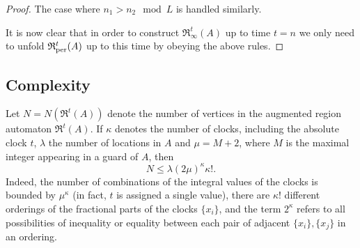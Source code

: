 \documentclass[11pt]{amsart}
\theoremstyle{definition}
\newcommand{\ARRR}{\mathfrak{R}^t}
\newcommand{\IARRR}{\mathfrak{R}_{\infty}^{t}}
\newcommand{\PARRR}{\mathfrak{R}_\textnormal{per}^{t}}
\newcommand{\ZNaturals}{\mathbb{N}_0}
\begin{document}
\begin{proof}
	The case where $n_1 > n_2 \mod L$ is handled similarly.   
	 \iffalse	
	So, let $e$ be a directed edge of $\PARRR(A)$ joining a vertex of integral time $\lfloor t \rfloor = n_1 + L\ZNaturals$, to a vertex of integral time $\lfloor t \rfloor = n_2 + L\ZNaturals$.
	Suppose also that $n_1 \leq n_2$ then there are then two possibilities.
	Either the edge represents a minimal time difference $n_2-n_1$ or a minimal time difference $n_2+L-n_1$.
	In order to distinguish between these two cases we mark the edge in the latter case with a plus sign.
	Since the period $L$ satisfies $L>M$ then if the time difference  $n_2+kL-n_1$, for some $k > 1$ then necessarily there exists also a similar edge with time difference $n_2+L-n_1$, thus the minimal time difference cannot be $n_2+kL-n_1$, $k > 1$.
	However, we need also distinguish between the case where there is only one possible time difference $d$ or there are infinitely-many time differences $d + kL$, $k \geq 0$, and in the latter case we mark the edge with $(*)$.
	
	Similarly, when $n_1 > n_2$ then either the minimal time difference is $n_2+L-n_1$ or a minimal time difference $n_2+2L-n_1$, and in the latter case we mark the edge with a plus sign.
	Again, we add also the $(*)$ mark to represent the infinitely-many time differences $d + kL$, $k \geq 0$. 
	\fi
	It is now clear that in order to construct $\IARRR(A)$ up to time $t=n$ we only need to unfold $\PARRR(A)$ up to this time by obeying the above rules.
\end{proof}
\subsection{Complexity}
Let $N = N(\ARRR(A))$ denote the number of vertices in the augmented region automaton $\ARRR(A)$.
If $\kappa$ denotes the number of clocks, including the absolute clock $t$, $\lambda$ the number of locations in $A$ and $\mu=M+2$, where $M$ is the maximal integer appearing in a guard of $A$, then
\begin{equation}
N \leq \lambda (2\mu)^{\kappa} \kappa!.
\end{equation}
Indeed, the number of combinations of the integral values of the clocks is bounded by $\mu^{\kappa}$ (in fact, $t$ is assigned a single value), there are $\kappa!$ different orderings of the fractional parts of the clocks $\{x_i\}$, and the term $2^{\kappa}$ refers to all possibilities of inequality or equality between each pair of adjacent $\{x_i\}, \{x_j\}$ in an ordering.
\end{document}
